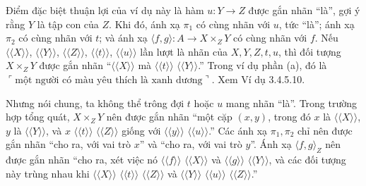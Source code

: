 \begin{enumerate}[label=\alph*.]
Điểm đặc biệt thuận lợi của ví dụ này là hàm $u:Y\to Z$ được gắn nhãn ``là'', gợi ý rằng $Y$ là tập con của $Z$. Khi đó, ánh xạ $\pi_1$ có cùng nhãn với $u$, tức ``là''; ánh xạ $\pi_2$ có cùng nhãn với $t$; và ánh xạ $\langle f,g\rangle:A\to X\times_ZY$ có cùng nhãn với $f$. Nếu $\langle\!\langle X\rangle\!\rangle$, $\langle\!\langle Y\rangle\!\rangle$, $\langle\!\langle Z\rangle\!\rangle$, $\langle\!\langle t\rangle\!\rangle$, $\langle\!\langle u\rangle\!\rangle$ lần lượt là nhãn của $X,Y,Z,t,u$, thì đối tượng $X\times_ZY$ được gắn nhãn ``$\langle\!\langle X\rangle\!\rangle$ mà $\langle\!\langle t\rangle\!\rangle$ $\langle\!\langle Y\rangle\!\rangle$.'' Trong ví dụ phần (a), đó là $\ulcorner\text{một người có màu }\allowbreak\text{yêu thích là xanh }\allowbreak\text{dương}\urcorner$. Xem Ví dụ 3.4.5.10.

Nhưng nói chung, ta không thể trông đợi $t$ hoặc $u$ mang nhãn ``là''. Trong trường hợp tổng quát, $X\times_ZY$ nên được gắn nhãn ``một cặp $(x,y)$, trong đó $x$ là $\langle\!\langle X\rangle\!\rangle$, $y$ là $\langle\!\langle Y\rangle\!\rangle$, và $x$ $\langle\!\langle t\rangle\!\rangle$ $\langle\!\langle Z\rangle\!\rangle$ giống với
$\langle\!\langle y\rangle\!\rangle$ $\langle\!\langle u\rangle\!\rangle$.''  Các ánh xạ $\pi_1,\pi_2$ chỉ nên được gắn nhãn ``cho ra, với vai trò $x$'' và ``cho ra, với vai trò $y$''. Ánh xạ $\langle f,g\rangle_Z$ nên được gắn nhãn ``cho ra, xét việc nó $\langle\!\langle f\rangle\!\rangle$ $\langle\!\langle X\rangle\!\rangle$ và $\langle\!\langle g\rangle\!\rangle$ $\langle\!\langle Y\rangle\!\rangle$, và các đối tượng này trùng nhau khi $\langle\!\langle X\rangle\!\rangle$ $\langle\!\langle t\rangle\!\rangle$ $\langle\!\langle Z\rangle\!\rangle$ và $\langle\!\langle Y\rangle\!\rangle$ $\langle\!\langle u\rangle\!\rangle$ $\langle\!\langle Z\rangle\!\rangle$.''
\end{enumerate}

